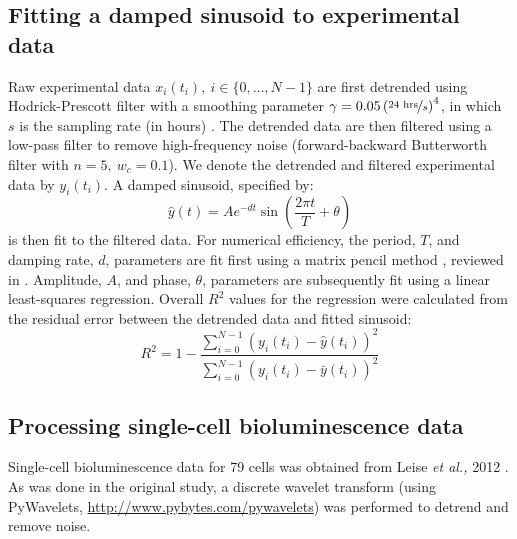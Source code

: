 \documentclass[11pt, letterpaper]{article}
\begin{document}
\subsection*{Fitting a damped sinusoid to experimental data}
Raw experimental data $x_i(t_i), \  i \in \{0, \dots, N-1\}$ are first detrended using Hodrick-Prescott filter with a smoothing parameter $\gamma = 0.05\left(\nicefrac{24 \text{ hrs}}{s}\right)^4$, in which $s$ is the sampling rate (in hours) \cite{Ravn2002}.
The detrended data are then filtered using a low-pass filter to remove high-frequency noise (forward-backward Butterworth filter with $n = 5,\ w_c = 0.1$).
We denote the detrended and filtered experimental data by $y_i(t_i)$.
A damped sinusoid, specified by:
\[
  \hat{y}(t) = A e^{-d t} \sin\left(\frac{2\pi t}{T} + \theta\right)
\]
is then fit to the filtered data.
For numerical efficiency, the period, $T$, and damping rate, $d$, parameters are fit first using a matrix pencil method \cite{Hua1990}, reviewed in \cite{Zielinski2011}.
Amplitude, $A$, and phase, $\theta$, parameters are subsequently fit using a linear least-squares regression.
Overall $R^2$ values for the regression were calculated from the residual error between the detrended data and fitted sinusoid:
\[
  R^2 = 1 - \frac{\sum_{i = 0}^{N-1} (y_i(t_i) - \hat{y}(t_i))^2}{\sum_{i = 0}^{N-1} (y_i(t_i) - \bar{y}(t_i))^2}
\]


\subsection*{Processing single-cell bioluminescence data}

Single-cell bioluminescence data for 79 cells was obtained from Leise {\itshape et al.,} 2012 \cite{Leise2012}.
As was done in the original study, a discrete wavelet transform (using PyWavelets, \url{http://www.pybytes.com/pywavelets}) was performed to detrend and remove noise.
\end{document}
